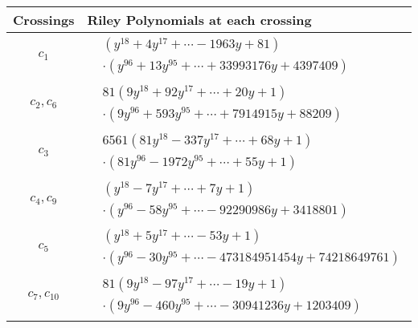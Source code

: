 \documentclass[1p]{elsarticle_modified}
\theoremstyle{definition}
\begin{document}
\begin{tabular}{m{50pt}|m{274pt}}
Crossings & \hspace{64pt}Riley Polynomials at each crossing \\
\hline $$\begin{aligned}c_{1}\end{aligned}$$&$\begin{aligned}
&(y^{18}+4 y^{17}+\cdots-1963 y+81)\\
&\cdot(y^{96}+13 y^{95}+\cdots+33993176 y+4397409)
\end{aligned}$\\
\hline $$\begin{aligned}c_{2},c_{6}\end{aligned}$$&$\begin{aligned}
&81(9 y^{18}+92 y^{17}+\cdots+20 y+1)\\
&\cdot(9 y^{96}+593 y^{95}+\cdots+7914915 y+88209)
\end{aligned}$\\
\hline $$\begin{aligned}c_{3}\end{aligned}$$&$\begin{aligned}
&6561(81 y^{18}-337 y^{17}+\cdots+68 y+1)\\
&\cdot(81 y^{96}-1972 y^{95}+\cdots+55 y+1)
\end{aligned}$\\
\hline $$\begin{aligned}c_{4},c_{9}\end{aligned}$$&$\begin{aligned}
&(y^{18}-7 y^{17}+\cdots+7 y+1)\\
&\cdot(y^{96}-58 y^{95}+\cdots-92290986 y+3418801)
\end{aligned}$\\
\hline $$\begin{aligned}c_{5}\end{aligned}$$&$\begin{aligned}
&(y^{18}+5 y^{17}+\cdots-53 y+1)\\
&\cdot(y^{96}-30 y^{95}+\cdots-473184951454 y+74218649761)
\end{aligned}$\\
\hline $$\begin{aligned}c_{7},c_{10}\end{aligned}$$&$\begin{aligned}
&81(9 y^{18}-97 y^{17}+\cdots-19 y+1)\\
&\cdot(9 y^{96}-460 y^{95}+\cdots-30941236 y+1203409)
\end{aligned}$\\

\end{tabular}
\end{document}
